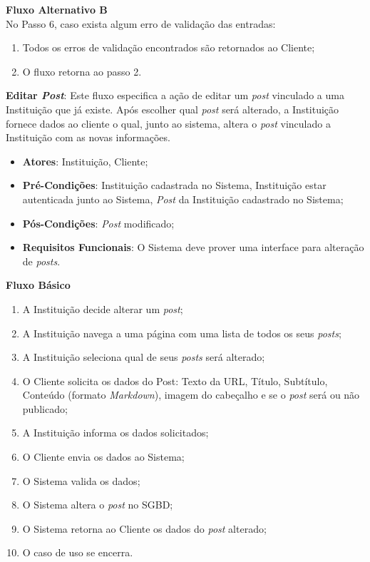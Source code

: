 \begin{anexosenv}
\begin{lista}
    \textbf{Fluxo Alternativo B} \\
    No Passo 6, caso exista algum erro de validação das entradas:
    \begin{enumerate}
    \item Todos os erros de validação encontrados são retornados ao Cliente;
    \item O fluxo retorna ao passo 2.
    \end{enumerate}
  
  
  
  \item \textbf{Editar \emph{Post}}: Este fluxo especifica a ação de editar um \emph{post} vinculado a uma Instituição que já existe. Após escolher qual \emph{post} será alterado, a Instituição fornece dados ao cliente o qual, junto ao sistema, altera o \emph{post} vinculado a Instituição com as novas informações.
    \begin{itemize}
    \item \textbf{Atores}: Instituição, Cliente;
    \item \textbf{Pré-Condições}: Instituição cadastrada no Sistema, Instituição estar autenticada junto ao Sistema, \emph{Post} da Instituição cadastrado no Sistema;
    \item \textbf{Pós-Condições}: \emph{Post} modificado;
    \item \textbf{Requisitos Funcionais}: O Sistema deve prover uma interface para alteração de \emph{posts}.
    \end{itemize}
	
    \textbf{Fluxo Básico}
    \begin{enumerate}
    \item A Instituição decide alterar um \emph{post};
    \item A Instituição navega a uma página com uma lista de todos os seus \emph{posts};
    \item A Instituição seleciona qual de seus \emph{posts} será alterado;
    \item O Cliente solicita os dados do Post: Texto da URL, Título, Subtítulo, Conteúdo (formato \emph{Markdown}), imagem do cabeçalho e se o \emph{post} será ou não publicado;
    \item A Instituição informa os dados solicitados;
    \item O Cliente envia os dados ao Sistema;
    \item O Sistema valida os dados;
    \item O Sistema altera o \emph{post} no SGBD;
    \item O Sistema retorna ao Cliente os dados do \emph{post} alterado;
    \item O caso de uso se encerra.
    \end{enumerate}
    

\end{lista}
\end{anexosenv}
